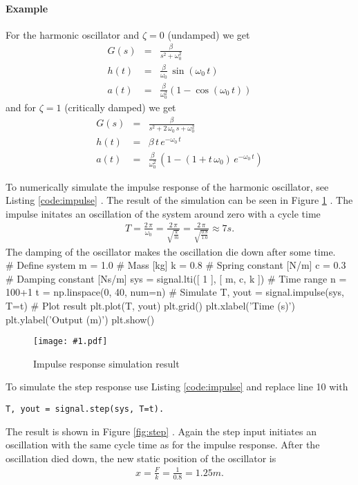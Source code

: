 \documentclass[a4paper,12pt]{article}
\newcommand{\Fig}[3]{%
	\begin{figure}[htb]%
	\begin{center}%
	\texttt{[image: \#1.pdf]}%
	\end{center}%
	\caption{#3\label{fig:#1}}%
	\end{figure}%
	}
\newcommand{\FigRef}[1]{%
	Figure \ref{fig:#1}%
	}
\newcommand*{\CodeLabel}{}
\newcommand*{\CodeCaption}{}
\newenvironment{code}[4]%
	{\renewcommand*{\CodeLabel}{#2}\renewcommand*{\CodeCaption}{#3}\codefloat\hrulefill\minted[#4]{#1}}
	{\endminted\caption{\CodeCaption\label{code:\CodeLabel}}\hrulefill\endcodefloat}
\newcommand{\CodeRef}[1]{%
	Listing \ref{code:#1}%
	}
\begin{document}
\paragraph{Example}

For the harmonic oscillator and $\zeta=0$ (undamped) we get
\begin{eqnarray}
G(s)&=&\frac{\beta}{s^2+\omega_0^2}\\
h(t)&=&\frac{\beta}{\omega_0}\,\sin(\omega_0\,t)\\
a(t)&=&\frac{\beta}{\omega_0^2}\left(1-\cos(\omega_0\,t)\right)
\end{eqnarray}
and for $\zeta=1$ (critically damped) we get
\begin{eqnarray}
G(s)&=&\frac{\beta}{s^2+2\,\omega_0\,s+\omega_0^2}\\
h(t)&=&\beta\,t\,e^{-\omega_0\,t}\\
a(t)&=&\frac{\beta}{\omega_0^2}\,\left(1-\left(1+t\,\omega_0\right)\,e^{-\omega_0\,t}\right)
\end{eqnarray}

To numerically simulate the impulse response of the harmonic oscillator, see
\CodeRef{impulse}. The result of the simulation can be seen in \FigRef{impulse}.
The impulse initates an oscillation of the system around zero with a cycle time
\begin{eqnarray}
T=\frac{2\,\pi}{\omega_0}=\frac{2\,\pi}{\sqrt{\frac{k}{m}}}=\frac{2\,\pi}{\sqrt{\frac{0.8}{1.0}}}\approx 7\unit{s}.
\end{eqnarray}
The damping of the oscillator makes the oscillation die down after some time.\\

\begin{code}{python}{impulse}{Simulate the impulse response of a system}{linenos}
# Define system
m = 1.0 # Mass [kg]
k = 0.8 # Spring constant [N/m]
c = 0.3 # Damping constant [Ns/m]
sys = signal.lti([ 1 ], [ m, c, k ])
# Time range
n = 100+1
t = np.linspace(0, 40, num=n)
# Simulate
T, yout = signal.impulse(sys, T=t)
# Plot result
plt.plot(T, yout)
plt.grid()
plt.xlabel('Time (s)')
plt.ylabel('Output (m)')
plt.show()
\end{code}

\Fig{impulse}{0.7}{Impulse response simulation result}

To simulate the step response use \CodeRef{impulse} and replace line 10 with
\begin{verbatim}
T, yout = signal.step(sys, T=t).
\end{verbatim}
The result is shown in \FigRef{step}. Again the step input initiates an
oscillation with the same cycle time as for the impulse response. After the
oscillation died down, the new static position of the oscillator is
\begin{eqnarray}
x=\frac{F}{k}=\frac{1}{0.8}=1.25\unit{m}.
\end{eqnarray}
\end{document}
